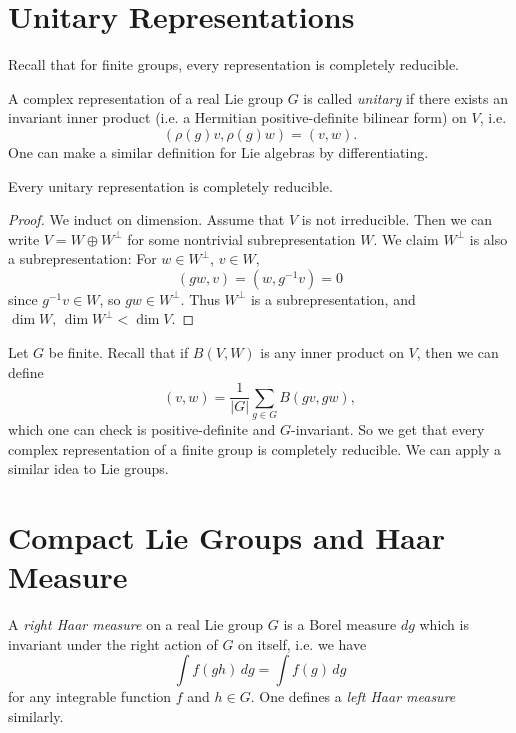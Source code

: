 \section{Unitary Representations}

\begin{remark}
  Recall that for finite groups,
  every representation is completely
  reducible.
\end{remark}

\begin{definition}
  A complex representation of a real Lie
  group $G$ is called \emph{unitary}
  if there exists an invariant inner product
  (i.e. a Hermitian positive-definite
  bilinear form)
  on $V$, i.e.
  \[(\rho(g) v, \rho(g) w) = (v, w).\]
  One can make a similar definition for
  Lie algebras by differentiating.
\end{definition}

\begin{theorem}\label{thm:unitary}
  Every unitary representation is
  completely reducible.
\end{theorem}

\begin{proof}
  We induct on dimension. Assume that
  $V$ is not irreducible. Then
  we can write
  $V = W \oplus W^\perp$ for some
  nontrivial subrepresentation $W$.
  We claim $W^\perp$ is
  also a subrepresentation: For
  $w \in W^\perp$, $v \in W$,
  \[
    (gw, v)
    = (w, g^{-1} v)
    = 0
  \]
  since $g^{-1} v \in W$, so
  $gw \in W^\perp$. Thus
  $W^\perp$ is a subrepresentation, and
  $\dim W,\, \dim W^\perp < \dim V$.
\end{proof}

\begin{remark}
  Let $G$ be finite.
  Recall that if $B(V, W)$ is any inner
  product on $V$, then we can define
  \[
    (v, w) = \frac{1}{|G|} \sum_{g \in G} B(g v, g w),
  \]
  which one can check is positive-definite
  and $G$-invariant. So we get
  that every complex representation of a
  finite group is completely reducible.
  We can apply a similar idea to
  Lie groups.
\end{remark}

\section{Compact Lie Groups and Haar Measure}

\begin{definition}
  A \emph{right Haar measure} on a real
  Lie group $G$ is a Borel measure $dg$
  which is invariant under the right
  action of $G$ on itself, i.e. we have
  \[
    \int f(gh)\, dg
    = \int f(g)\, dg
  \]
  for any integrable function $f$ and
  $h \in G$. One defines a
  \emph{left Haar measure} similarly.
\end{definition}

